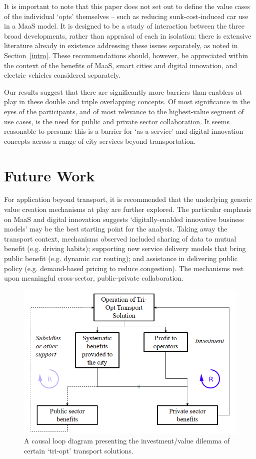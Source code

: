 \documentclass[b5paper,10pt]{article}
\begin{document}
It is important to note that this paper does not set out to define the
value cases of the individual `opts' themselves -- such as reducing
sunk-cost-induced car use in a MaaS model. It is designed to be a
study of interaction between the three broad developments, rather than
appraisal of each in isolation: there is extensive literature already
in existence addressing these issues separately, as noted in
Section~\ref{intro}. These recommendations should, however, be
appreciated within the context of the benefits of MaaS, smart cities
and digital innovation, and electric vehicles considered separately.

Our results suggest that there are significantly more barriers than
enablers at play in these double and triple overlapping concepts. Of
most significance in the eyes of the participants, and of most
relevance to the highest-value segment of use cases, is the need for
public and private sector collaboration. It seems reasonable to
presume this is a barrier for `as-a-service' and digital innovation
concepts across a range of city services beyond transportation.

\section{Future Work}\label{future}

For application beyond transport, it is recommended that the
underlying generic value creation mechanisms at play are further
explored. The particular emphasis on MaaS and digital innovation
suggests `digitally-enabled innovative business models' may be the
best starting point for the analysis. Taking away the transport
context, mechanisms observed included sharing of data to mutual
benefit (e.g. driving habits); supporting new service delivery models
that bring public benefit (e.g. dynamic car routing); and assistance
in delivering public policy (e.g. demand-based pricing to reduce
congestion). The mechanisms rest upon meaningful cross-sector,
public-private collaboration.

\begin{figure}[!h]
\centering
\includegraphics[width=0.7\columnwidth]{images/causalloop.png}
\caption{A causal loop diagram presenting the investment/value
  dilemma of certain `tri-opt' transport solutions.}
\label{fig:causalloop}
\end{figure}
\end{document}
